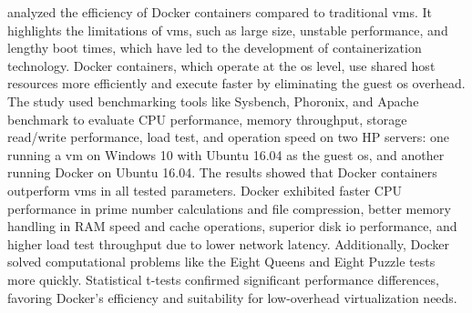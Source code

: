 \citet{potdarPerformanceEvaluationDocker2020} analyzed the efficiency of Docker containers compared to traditional \acp{vm}.
It highlights the limitations of \acp{vm}, such as large size, unstable performance, and lengthy boot times, which have led to the development of containerization technology.
Docker containers, which operate at the \ac{os} level, use shared host resources more efficiently and execute faster by eliminating the guest \ac{os} overhead.
The study used benchmarking tools like Sysbench, Phoronix, and Apache benchmark to evaluate CPU performance, memory throughput, storage read/write performance, load test, and operation speed on two HP servers: one running a \ac{vm} on Windows 10 with Ubuntu 16.04 as the guest \ac{os}, and another running Docker on Ubuntu 16.04.
The results showed that Docker containers outperform \acp{vm} in all tested parameters.
Docker exhibited faster CPU performance in prime number calculations and file compression, better memory handling in RAM speed and cache operations, superior disk \ac{io} performance, and higher load test throughput due to lower network latency.
Additionally, Docker solved computational problems like the Eight Queens and Eight Puzzle tests more quickly.
Statistical t-tests confirmed significant performance differences, favoring Docker's efficiency and suitability for low-overhead virtualization needs.

